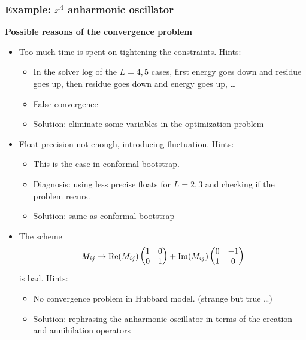 \documentclass{beamer}
\begin{document}
\begin{frame}
\frametitle{Example: $x^4$ anharmonic oscillator}

\textbf{Possible reasons of the convergence problem}

\begin{itemize}
    \item Too much time is spent on tightening the constraints. Hints:
    \begin{itemize}
        \item In the solver log of the $L=4, 5$ cases, first energy goes down and residue goes up, then residue goes down and energy goes up, \dots
        \item False convergence
        \item Solution: eliminate some variables in the optimization problem
    \end{itemize}
    \item Float precision not enough, introducing fluctuation. Hints:
    \begin{itemize}
        \item This is the case in conformal bootstrap.
        \item Diagnosis: using less precise floats for $L= 2, 3$ and checking if the problem recurs.
        \item Solution: same as conformal bootstrap
    \end{itemize}
    \item The scheme
    \begin{equation}
        M_{ij} \to \Re(M_{ij}) \pmqty{1 & 0 \\ 0 & 1} + \Im(M_{ij}) \pmqty{0 & -1 \\ 1 & 0}
    \end{equation}
    is bad. Hints:
    \begin{itemize}
        \item No convergence problem in Hubbard model. (strange but true \dots)
        \item Solution: rephrasing the anharmonic oscillator in terms of the creation and annihilation operators
    \end{itemize}
\end{itemize}

\end{frame}
\end{document}
